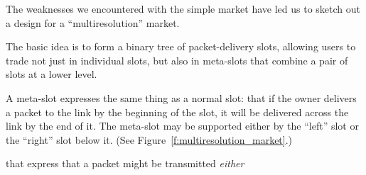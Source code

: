 The weaknesses we encountered with the simple market have led us to
sketch out a design for a ``multiresolution'' market.

The basic idea is to form a binary tree of packet-delivery slots,
allowing users to trade not just in individual slots, but also in
meta-slots that combine a pair of slots at a lower level.

A meta-slot expresses the same thing as a normal slot: that if the
owner delivers a packet to the link by the beginning of the slot, it
will be delivered across the link by the end of it. The meta-slot may
be supported either by the ``left'' slot or the ``right'' slot below
it. (See Figure~\ref{f:multiresolution_market}.)

 that express that a packet
might be transmitted \emph{either}

